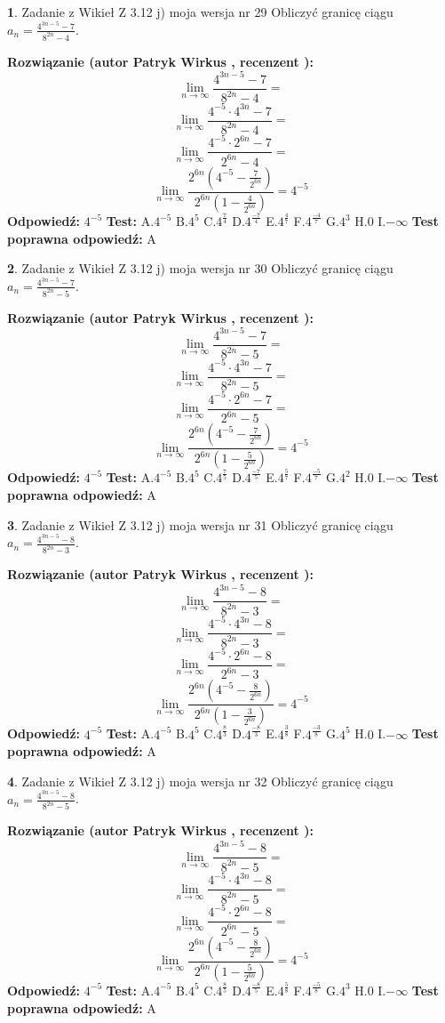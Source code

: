 \documentclass[12pt, a4paper]{article}
\theoremstyle{definition} %
\newtheorem{zad}{}
\newcommand{\zadStart}[1]{\begin{zad}#1\newline}
\newcommand{\zadStop}{\end{zad}}
\newcommand{\rozwStart}[2]{\noindent \textbf{Rozwiązanie (autor #1 , recenzent #2): }\newline}
\newcommand{\rozwStop}{\newline}
\newcommand{\odpStart}{\noindent \textbf{Odpowiedź:}\newline}
\newcommand{\odpStop}{\newline}
\newcommand{\testStart}{\noindent \textbf{Test:}\newline}
\newcommand{\testStop}{\newline}
\newcommand{\kluczStart}{\noindent \textbf{Test poprawna odpowiedź:}\newline}
\newcommand{\kluczStop}{\newline}
\begin{document}
\zadStart{Zadanie z Wikieł Z 3.12 j) moja wersja nr 29}
Obliczyć granicę ciągu $a_{n}=\frac{4^{3n-5}-7}{8^{2n}-4}$.
\zadStop
\rozwStart{Patryk Wirkus}{}
$$\lim\limits_{n\to\infty}\frac{4^{3n-5}-7}{8^{2n}-4}=$$
$$\lim\limits_{n\to\infty}\frac{4^{-5} \cdot 4^{3n}-7}{8^{2n}-4}=$$
$$\lim\limits_{n\to\infty}\frac{4^{-5} \cdot 2^{6n}-7}{2^{6n}-4}=$$
$$\lim\limits_{n\to\infty}\frac{2^{6n}(4^{-5} - \frac{7}{2^{6n}})}{2^{6n}(1-\frac{4}{2^{6n}})}= 4^{-5}$$
\rozwStop
\odpStart
$4^{-5}$
\odpStop
\testStart
A.$4^{-5}$
B.$4^{5}$
C.$4^{\frac{7}{4}}$
D.$4^{\frac{-7}{4}}$
E.$4^{\frac{4}{7}}$
F.$4^{\frac{-4}{7}}$
G.$4^{3}$
H.$0$
I.$-\infty$
\testStop
\kluczStart
A
\kluczStop



\zadStart{Zadanie z Wikieł Z 3.12 j) moja wersja nr 30}
Obliczyć granicę ciągu $a_{n}=\frac{4^{3n-5}-7}{8^{2n}-5}$.
\zadStop
\rozwStart{Patryk Wirkus}{}
$$\lim\limits_{n\to\infty}\frac{4^{3n-5}-7}{8^{2n}-5}=$$
$$\lim\limits_{n\to\infty}\frac{4^{-5} \cdot 4^{3n}-7}{8^{2n}-5}=$$
$$\lim\limits_{n\to\infty}\frac{4^{-5} \cdot 2^{6n}-7}{2^{6n}-5}=$$
$$\lim\limits_{n\to\infty}\frac{2^{6n}(4^{-5} - \frac{7}{2^{6n}})}{2^{6n}(1-\frac{5}{2^{6n}})}= 4^{-5}$$
\rozwStop
\odpStart
$4^{-5}$
\odpStop
\testStart
A.$4^{-5}$
B.$4^{5}$
C.$4^{\frac{7}{5}}$
D.$4^{\frac{-7}{5}}$
E.$4^{\frac{5}{7}}$
F.$4^{\frac{-5}{7}}$
G.$4^{2}$
H.$0$
I.$-\infty$
\testStop
\kluczStart
A
\kluczStop



\zadStart{Zadanie z Wikieł Z 3.12 j) moja wersja nr 31}
Obliczyć granicę ciągu $a_{n}=\frac{4^{3n-5}-8}{8^{2n}-3}$.
\zadStop
\rozwStart{Patryk Wirkus}{}
$$\lim\limits_{n\to\infty}\frac{4^{3n-5}-8}{8^{2n}-3}=$$
$$\lim\limits_{n\to\infty}\frac{4^{-5} \cdot 4^{3n}-8}{8^{2n}-3}=$$
$$\lim\limits_{n\to\infty}\frac{4^{-5} \cdot 2^{6n}-8}{2^{6n}-3}=$$
$$\lim\limits_{n\to\infty}\frac{2^{6n}(4^{-5} - \frac{8}{2^{6n}})}{2^{6n}(1-\frac{3}{2^{6n}})}= 4^{-5}$$
\rozwStop
\odpStart
$4^{-5}$
\odpStop
\testStart
A.$4^{-5}$
B.$4^{5}$
C.$4^{\frac{8}{3}}$
D.$4^{\frac{-8}{3}}$
E.$4^{\frac{3}{8}}$
F.$4^{\frac{-3}{8}}$
G.$4^{5}$
H.$0$
I.$-\infty$
\testStop
\kluczStart
A
\kluczStop



\zadStart{Zadanie z Wikieł Z 3.12 j) moja wersja nr 32}
Obliczyć granicę ciągu $a_{n}=\frac{4^{3n-5}-8}{8^{2n}-5}$.
\zadStop
\rozwStart{Patryk Wirkus}{}
$$\lim\limits_{n\to\infty}\frac{4^{3n-5}-8}{8^{2n}-5}=$$
$$\lim\limits_{n\to\infty}\frac{4^{-5} \cdot 4^{3n}-8}{8^{2n}-5}=$$
$$\lim\limits_{n\to\infty}\frac{4^{-5} \cdot 2^{6n}-8}{2^{6n}-5}=$$
$$\lim\limits_{n\to\infty}\frac{2^{6n}(4^{-5} - \frac{8}{2^{6n}})}{2^{6n}(1-\frac{5}{2^{6n}})}= 4^{-5}$$
\rozwStop
\odpStart
$4^{-5}$
\odpStop
\testStart
A.$4^{-5}$
B.$4^{5}$
C.$4^{\frac{8}{5}}$
D.$4^{\frac{-8}{5}}$
E.$4^{\frac{5}{8}}$
F.$4^{\frac{-5}{8}}$
G.$4^{3}$
H.$0$
I.$-\infty$
\testStop
\kluczStart
A
\kluczStop
\end{document}
